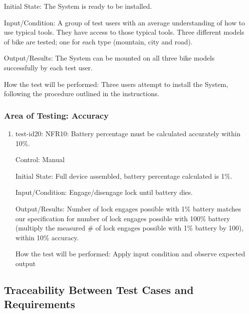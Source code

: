 \documentclass[12pt, titlepage]{article}
\begin{document}
\begin{enumerate}
Initial State: The System is ready to be installed. 

Input/Condition: A group of test users with an average understanding of how to use typical tools. They have access to those typical tools. Three different models of bike are tested; one for each type (mountain, city and road). 

Output/Results: The System can be mounted on all three bike models successfully by each test user. 

How the test will be performed: Three users attempt to install the System, following the procedure outlined in the instructions.  

\end{enumerate}

\subsubsection{Area of Testing: Accuracy}

\begin{enumerate}

\item{test-id20: NFR10: Battery percentage must be calculated accurately within 10\%. \\}

Control: Manual

Initial State: Full device assembled, battery percentage calculated is 1\%. 

Input/Condition: Engage/disengage lock until battery dies.

Output/Results: Number of lock engages possible with 1\% battery matches our specification for number of lock engages possible with 100\% battery (multiply the measured \# of lock engages possible with 1\% battery by 100), within 10\% accuracy.

How the test will be performed: Apply input condition and observe expected output

\end{enumerate}

\subsection{Traceability Between Test Cases and Requirements}
\end{document}
